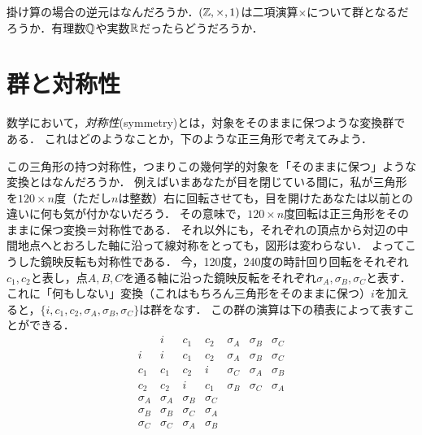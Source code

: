 \documentclass[11pt,a4paper]{jsarticle}
\begin{document}
\begin{exercise}
    掛け算の場合の逆元はなんだろうか．$(\mathbb{Z}, \times, 1)$は二項演算$\times$について群となるだろうか．有理数$\mathbb{Q}$や実数$\mathbb{R}$だったらどうだろうか．
\end{exercise}
 

\section{群と対称性}

数学において，\emph{対称性}(symmetry)とは，対象をそのままに保つような変換群である．
これはどのようなことか，下のような正三角形で考えてみよう．
\begin{center}
\end{center}
この三角形の持つ対称性，つまりこの幾何学的対象を「そのままに保つ」ような変換とはなんだろうか．
例えばいまあなたが目を閉じている間に，私が三角形を$120\times n$度（ただし$n$は整数）右に回転させても，目を開けたあなたは以前との違いに何も気が付かないだろう．
その意味で，$120\times n$度回転は正三角形をそのままに保つ変換＝対称性である．
それ以外にも，それぞれの頂点から対辺の中間地点へとおろした軸に沿って線対称をとっても，図形は変わらない．
よってこうした鏡映反転も対称性である．
今，120度，240度の時計回り回転をそれぞれ$c_1, c_2$と表し，点$A, B, C$を通る軸に沿った鏡映反転をそれぞれ$\sigma_A, \sigma_B, \sigma_C$と表す．
これに「何もしない」変換（これはもちろん三角形をそのままに保つ）$i$を加えると，$\{i, c_1, c_2, \sigma_A, \sigma_B, \sigma_C\}$は群をなす．
この群の演算は下の積表によって表すことができる．
\[
\begin{array}{c|cccccc}
       & i & c_1 & c_2 & \sigma_A & \sigma_B & \sigma_C \\ \hline
       i & i & c_1 & c_2 & \sigma_A & \sigma_B & \sigma_C \\ 
       c_1 & c_1 & c_2 & i &  \sigma_C & \sigma_A & \sigma_B  \\ 
       c_2 & c_2 & i & c_1 &  \sigma_B & \sigma_C & \sigma_A \\ 
       \sigma_A & \sigma_A & \sigma_B & \sigma_C &  &  &  \\ 
       \sigma_B & \sigma_B & \sigma_C & \sigma_A & & &  \\ 
       \sigma_C & \sigma_C & \sigma_A & \sigma_B & &  &  \\ 
     
\end{array}
\]
\end{document}
